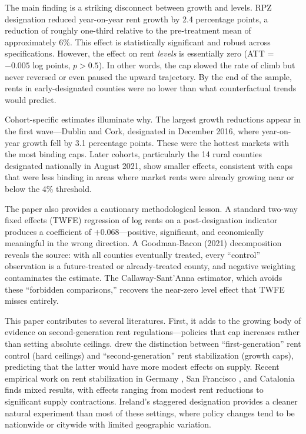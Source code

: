 \documentclass[12pt]{article}
\begin{document}
The main finding is a striking disconnect between growth and levels. RPZ designation reduced year-on-year rent growth by 2.4 percentage points, a reduction of roughly one-third relative to the pre-treatment mean of approximately 6\%. This effect is statistically significant and robust across specifications. However, the effect on rent \textit{levels} is essentially zero (ATT = $-0.005$ log points, $p > 0.5$). In other words, the cap slowed the rate of climb but never reversed or even paused the upward trajectory. By the end of the sample, rents in early-designated counties were no lower than what counterfactual trends would predict.

Cohort-specific estimates illuminate why. The largest growth reductions appear in the first wave---Dublin and Cork, designated in December 2016, where year-on-year growth fell by 3.1 percentage points. These were the hottest markets with the most binding caps. Later cohorts, particularly the 14 rural counties designated nationally in August 2021, show smaller effects, consistent with caps that were less binding in areas where market rents were already growing near or below the 4\% threshold.

The paper also provides a cautionary methodological lesson. A standard two-way fixed effects (TWFE) regression of log rents on a post-designation indicator produces a coefficient of $+0.068$---positive, significant, and economically meaningful in the wrong direction. A Goodman-Bacon (2021) decomposition reveals the source: with all counties eventually treated, every ``control'' observation is a future-treated or already-treated county, and negative weighting contaminates the estimate. The Callaway-Sant'Anna estimator, which avoids these ``forbidden comparisons,'' recovers the near-zero level effect that TWFE misses entirely.

This paper contributes to several literatures. First, it adds to the growing body of evidence on second-generation rent regulations---policies that cap increases rather than setting absolute ceilings. \citet{arnott1995} drew the distinction between ``first-generation'' rent control (hard ceilings) and ``second-generation'' rent stabilization (growth caps), predicting that the latter would have more modest effects on supply. Recent empirical work on rent stabilization in Germany \citep{mense2019}, San Francisco \citep{diamond2019}, and Catalonia \citep{jofre-monseny2024} finds mixed results, with effects ranging from modest rent reductions to significant supply contractions. Ireland's staggered designation provides a cleaner natural experiment than most of these settings, where policy changes tend to be nationwide or citywide with limited geographic variation.
\end{document}
